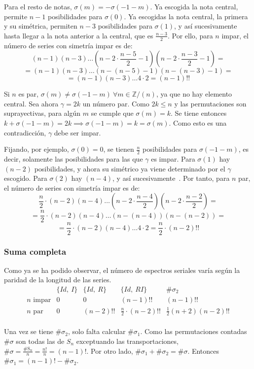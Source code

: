 		Para el resto de notas, $\sigma(m)=-\sigma(-1-m)$. Ya escogida la nota central, permite $n-1$ posibilidades para $\sigma(0)$. Ya escogidas la nota central, la primera y su sim\'etrica, permiten $n-3$ posibilidades para $\sigma(1)$, y as\'i sucesivamente hasta llegar a la nota anterior a la central, que es $\frac{n-3}{2}$. Por ello, para $n$ impar, el n\'umero de series con simetr\'ia impar es de:	
		\[(n-1)(n-3)\ldots(n-2\cdot\frac{n-5}{2}-1)(n-2\cdot\frac{n-3}{2}-1)=\]
		\[=(n-1)(n-3)\ldots(n-(n-5)-1)(n-(n-3)-1)=\]
		\[=(n-1)(n-3)\ldots4\cdot2=(n-1)!!\]
		
		Si $n$ es par, $\sigma(m)\neq\sigma(-1-m)\ \forall m\in \mathbb{Z} / (n)$, ya que no hay elemento central. Sea ahora $\gamma=2k$ un n\'umero par. Como $2k\leq n$ y las permutaciones son suprayectivas, para alg\'un $m$ se cumple que $\sigma(m)=k$. Se tiene entonces $k+\sigma(-1-m)=2k\implies\sigma(-1-m)=k=\sigma(m)$. Como esto es una contradicci\'on, $\gamma$ debe ser impar.
		
		Fijando, por ejemplo, $\sigma(0)=0$, se tienen $\frac{n}{2}$ posibilidades para $\sigma(-1-m)$, es decir, solamente las posibilidades para las que $\gamma$ es impar. Para $\sigma(1)$ hay $(n-2)$ posibilidades, y ahora su sim\'etrico ya viene determinado por el $\gamma$ escogido. Para $\sigma(2)$ hay $(n-4)$, y as\'i sucesivamente~\cite{reiner}. Por tanto, para $n$ par, el n\'umero de series con simetr\'ia impar es de: 
		\[\frac{n}{2}\cdot(n-2)(n-4)\ldots(n-2\cdot\frac{n-4}{2})(n-2\cdot\frac{n-2}{2})=\]
		\[=\frac{n}{2}\cdot(n-2)(n-4)\ldots(n-(n-4))(n-(n-2))=\]
		\[=\frac{n}{2}\cdot(n-2)(n-4)\ldots4\cdot2=\frac{n}{2}\cdot(n-2)!!\]
			
	\subsubsection*{Suma completa}
		Como ya se ha podido observar, el n\'umero de espectros seriales var\'ia seg\'un la paridad de la longitud de las series.		
		\def\arraystretch{1.5}
		\[\begin{array}{c|c|c|c|c}
		&\{Id,\ I\}&\{Id,\ R\}&\{Id,\ RI\}&\#\sigma_2\\\hline
		n\mbox{ impar}&0&0&(n-1)!!&(n-1)!!\\\hline
		n\mbox{ par}&0&(n-2)!!&\frac{n}{2}\cdot(n-2)!!&\frac{1}{2}(n+2)(n-2)!!\\
		\end{array}\]
		\def\arraystretch{1}
		
		Una vez se tiene $\#\sigma_2$, solo falta calcular $\#\sigma_1$. Como las permutaciones contadas $\#\sigma$ son todas las de ${S}_n$ exceptuando las transportaciones, $\#\sigma=\frac{\#\mbox{S}_n}{n}=\frac{n!}{n}=(n-1)!$. Por otro lado, $\#\sigma_1 +\#\sigma_2=\#\sigma$. Entonces $\#\sigma_1=(n-1)!-\#\sigma_2$.
		
